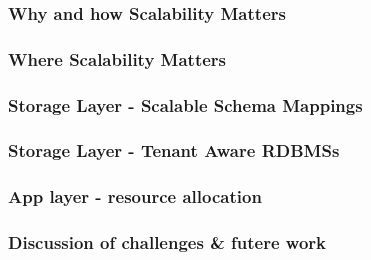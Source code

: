 
\subsubsection{Why and how Scalability Matters}

\subsubsection{Where Scalability Matters}

\subsubsection{Storage Layer - Scalable Schema Mappings}

\subsubsection{Storage Layer - Tenant Aware RDBMSs}

\subsubsection{App layer - resource allocation}

\subsubsection{Discussion of challenges \& futere work}
